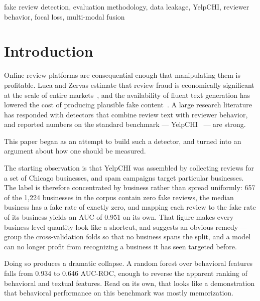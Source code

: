 \documentclass[conference]{IEEEtran}
\begin{document}
\begin{IEEEkeywords}
fake review detection, evaluation methodology, data leakage, YelpCHI,
reviewer behavior, focal loss, multi-modal fusion
\end{IEEEkeywords}


\section{Introduction}

Online review platforms are consequential enough that manipulating them is
profitable. Luca and Zervas estimate that review fraud is economically
significant at the scale of entire markets~\cite{luca2016fake}, and the
availability of fluent text generation has lowered the cost of producing
plausible fake content~\cite{crothers2023machine}. A large research literature
has responded with detectors that combine review text with reviewer behavior,
and reported numbers on the standard benchmark --- YelpCHI~\cite{rayana2015collective}
--- are strong.

This paper began as an attempt to build such a detector, and turned into an
argument about how one should be measured.

The starting observation is that YelpCHI was assembled by collecting reviews for
a set of Chicago businesses, and spam campaigns target particular businesses. The
label is therefore concentrated by business rather than spread uniformly: 657 of
the 1{,}224 businesses in the corpus contain zero fake reviews, the median
business has a fake rate of exactly zero, and mapping each review to the fake
rate of its business yields an AUC of 0.951 on its own. That figure makes every
business-level quantity look like a shortcut, and suggests an obvious remedy ---
group the cross-validation folds so that no business spans the split, and a model
can no longer profit from recognizing a business it has seen targeted before.

Doing so produces a dramatic collapse. A random forest over behavioral features
falls from 0.934 to 0.646 AUC-ROC, enough to reverse the apparent ranking of
behavioral and textual features. Read on its own, that looks like a
demonstration that behavioral performance on this benchmark was mostly
memorization.
\end{document}
